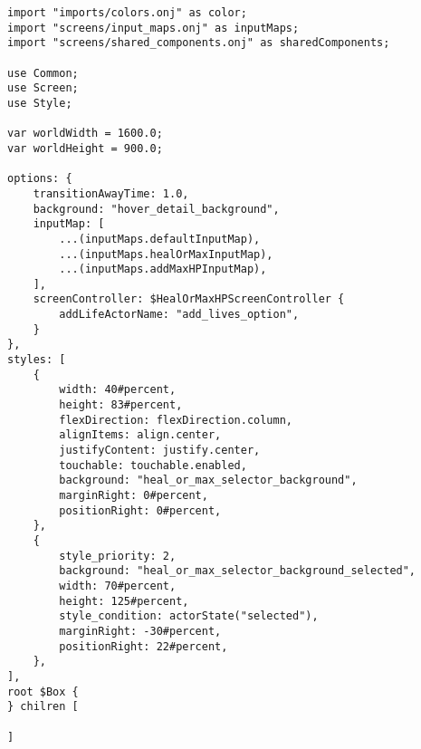 \begin{verbatim}
import "imports/colors.onj" as color;
import "screens/input_maps.onj" as inputMaps;
import "screens/shared_components.onj" as sharedComponents;

use Common;
use Screen;
use Style;

var worldWidth = 1600.0;
var worldHeight = 900.0;

options: {
    transitionAwayTime: 1.0,
    background: "hover_detail_background",
    inputMap: [
        ...(inputMaps.defaultInputMap),
        ...(inputMaps.healOrMaxInputMap),
        ...(inputMaps.addMaxHPInputMap),
    ],
    screenController: $HealOrMaxHPScreenController {
        addLifeActorName: "add_lives_option",
    }
},
styles: [
    {
        width: 40#percent,
        height: 83#percent,
        flexDirection: flexDirection.column,
        alignItems: align.center,
        justifyContent: justify.center,
        touchable: touchable.enabled,
        background: "heal_or_max_selector_background",
        marginRight: 0#percent,
        positionRight: 0#percent,
    },
    {
        style_priority: 2,
        background: "heal_or_max_selector_background_selected",
        width: 70#percent,
        height: 125#percent,
        style_condition: actorState("selected"),
        marginRight: -30#percent,
        positionRight: 22#percent,
    },
],
root $Box {
} chilren [

]
\end{verbatim}

\Blindtext

\renewcommand{\kapitelautor}{}
